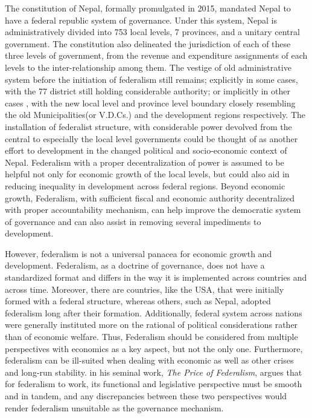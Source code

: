 The constitution of Nepal, formally promulgated in 2015, mandated Nepal to have a federal republic system of governance. Under this system, Nepal is administratively divided into 753 local levels, 7 provinces, and a unitary central government. The constitution also delineated the jurisdiction of each of these three levels of government, from the revenue and expenditure assignments of each levels to the inter-relationship among them. The vestige of old administrative system before the initiation of federalism still remains; explicitly in some cases, with the 77 district still holding considerable authority; or implicitly in other cases , with the new local level and province level boundary closely resembling the old Municipalities(or V.D.Cs.) and the development regions respectively. The installation of federalist structure, with considerable power devolved from the central to especially the local level governments could be thought of as another effort to development in the changed political and socio-economic context of Nepal. Federalism with a proper decentralization of power is assumed to be helpful not only for economic growth of the local levels\cite{Iimi2005,Sasana2019,Carniti2019},  but could also aid in reducing inequality in development across federal regions\cite{Baskaran2016}. Beyond economic growth, Federalism, with sufficient fiscal and economic authority decentralized with proper accountability mechanism, can help improve the democratic system of governance and can also assist in removing several impediments to development\cite{Weingast2014}.\par
However, federalism is not a universal panacea for economic growth and development. Federalism, as a doctrine of governance, does not have a standardized format and differs in the way it is implemented across countries and across time. Moreover, there are countries, like the USA, that were initially formed with a federal structure\cite{Sargent2012}, whereas others, such as Nepal, adopted federalism long after their formation. Additionally, federal system across nations were generally instituted more on the rational of political considerations rather than of economic welfare\cite{Riker1964}.  Thus, Federalism should be considered from multiple perspectives with economics as a key aspect, but not the only one. Furthermore, federalism can be ill-suited  when dealing with economic as well as other crises and long-run stability\cite{Huberfeld2020}.  in his seminal work, \textit{The Price of Federalism}, argues that for federalism to  work, its functional and legislative perspective must be smooth and in tandem, and any discrepancies between these two perspectives would render federalism unsuitable as the governance mechanism.  \par
